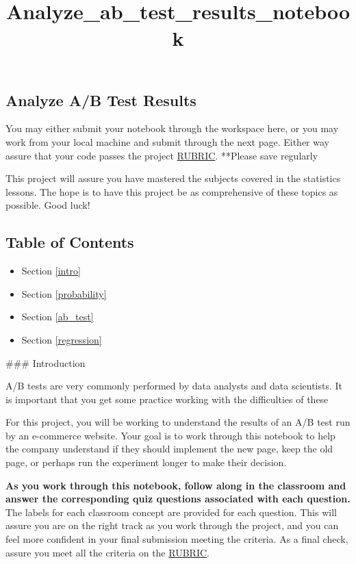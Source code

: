 \documentclass[11pt]{article}
\title{Analyze\_ab\_test\_results\_notebook}
\providecommand{\tightlist}{%
      \setlength{\itemsep}{0pt}\setlength{\parskip}{0pt}}
\begin{document}
    
    
    \maketitle
    
    

    
    \hypertarget{analyze-ab-test-results}{%
\subsection{Analyze A/B Test Results}\label{analyze-ab-test-results}}

You may either submit your notebook through the workspace here, or you
may work from your local machine and submit through the next page.
Either way assure that your code passes the project
\href{https://review.udacity.com/\#!/projects/37e27304-ad47-4eb0-a1ab-8c12f60e43d0/rubric}{RUBRIC}.
**Please save regularly

This project will assure you have mastered the subjects covered in the
statistics lessons. The hope is to have this project be as comprehensive
of these topics as possible. Good luck!

\hypertarget{table-of-contents}{%
\subsection{Table of Contents}\label{table-of-contents}}

\begin{itemize}
\tightlist
\item
  Section \ref{intro}
\item
  Section \ref{probability}
\item
  Section \ref{ab_test}
\item
  Section \ref{regression}
\end{itemize}

 \#\#\# Introduction

A/B tests are very commonly performed by data analysts and data
scientists. It is important that you get some practice working with the
difficulties of these

For this project, you will be working to understand the results of an
A/B test run by an e-commerce website. Your goal is to work through this
notebook to help the company understand if they should implement the new
page, keep the old page, or perhaps run the experiment longer to make
their decision.

\textbf{As you work through this notebook, follow along in the classroom
and answer the corresponding quiz questions associated with each
question.} The labels for each classroom concept are provided for each
question. This will assure you are on the right track as you work
through the project, and you can feel more confident in your final
submission meeting the criteria. As a final check, assure you meet all
the criteria on the
\href{https://review.udacity.com/\#!/projects/37e27304-ad47-4eb0-a1ab-8c12f60e43d0/rubric}{RUBRIC}.
\end{document}
